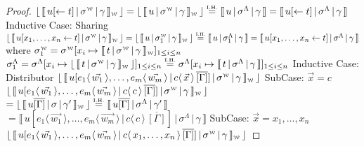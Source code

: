 \documentclass[a4paper,UKenglish,cleveref, autoref]{lipics-v2019}
\newcommand{\share}[3]{#1 [#2 \leftarrow #3]}
\newcommand{\dist}[5]{#1 [ #2 \, \vert \, \fakedist{#4}{#5} \, #3 ]}
\newcommand{\fakedist}[2]{#1 \langle \, #2 \, \rangle}
\newcommand{\weaksymbol}{\mbox{\tiny $\mathcal{W}$}}
\newcommand{\readbackwmap}[3]{\llbracket \, #1 \, \vert \, #2 \, \vert \, #3  \, \rrbracket }
\newcommand{\readweakwmap}[3]{\llbracket \, #1 \, \vert \, #2 \, \vert \, #3  \, \rrbracket_{\weaksymbol} }
\newcommand{\readbackweak}[1]{\lfloor \, #1 \, \rfloor}
\newcommand{\IH}{\stackrel{\hbox{\tiny I.H.}}{\hbox{=}}}
\begin{document}
\begin{proof}
$\readbackweak{\readweakwmap{\share{u}{}{t}}{\sigma^{\weaksymbol}}{\gamma}} = \readbackweak{\readweakwmap{u}{\sigma^{\weaksymbol}}{\gamma}} \IH \readbackwmap{u}{\sigma^{\Lambda}}{\gamma} = \readbackwmap{\share{u}{}{t}}{\sigma^{\Lambda}}{\gamma}$
\newline
\newline
Inductive Case: Sharing
\newline
$\readbackweak{\readweakwmap{\share{u}{x_{1}, \dots, x_{n}}{t}}{\sigma^{\weaksymbol}}{\gamma}} = \readbackweak{\readweakwmap{u}{\sigma_{1}^{\weaksymbol}}{\gamma}} \IH \readbackwmap{u}{\sigma_{1}^{\Lambda}}{\gamma}= \readbackwmap{\share{u}{x_{1}, \dots, x_{n}}{t}}{\sigma^{\Lambda}}{\gamma}$
\newline
where
\newline
$\sigma_{1}^{\weaksymbol} = \sigma^{\weaksymbol} [x_{i} \mapsto \readweakwmap{t}{\sigma^{\weaksymbol}}{\gamma}]_{1 \leq i \leq n}$
\newline
$\sigma_{1}^{\Lambda} = \sigma^{\Lambda} [x_{i} \mapsto \readbackweak{\readweakwmap{t}{\sigma^{\weaksymbol}}{\gamma}}]_{1 \leq i \leq n} \IH  \sigma^{\Lambda} [x_{i} \mapsto \readbackwmap{t}{\sigma^{\Lambda}}{\gamma} ]_{1 \leq i \leq n} $
\newline
\newline
Inductive Case: Distributor
\newline
$\readbackweak{\readweakwmap{\dist{u}{\fakedist{e_{1}}{\vec{w_{1}}}, \dots, \fakedist{e_{m}}{\vec{w_{m}}}}{\overline{[\Gamma]}}{c}{\vec{x}}}{\sigma^{\weaksymbol}}{\gamma}}$
\newline
\newline
\indent SubCase: $\vec{x} = c$
\newline
$\readbackweak{\readweakwmap{\dist{u}{\fakedist{e_{1}}{\vec{w_{1}}}, \dots, \fakedist{e_{m}}{\vec{w_{m}}}}{\overline{[\Gamma]}}{c}{c}}{\sigma^{\weaksymbol}}{\gamma}}$
\newline
$= \readbackweak{\readweakwmap{u \overline{[\Gamma]}}{\sigma}{\gamma'}} \IH \readbackwmap{u \overline{[\Gamma]}}{\sigma^{\Lambda}}{\gamma'}$
\newline
$= \readbackwmap{\dist{u}{\fakedist{e_{1}}{\vec{w_{1}}}, \dots, \fakedist{e_{m}}{\vec{w_{m}}}}{\overline{[\Gamma]}}{c}{c}}{\sigma^{\Lambda}}{\gamma}$
\newline
\newline
\indent SubCase: $\vec{x} = x_{1}, \dots, x_{n}$
\newline
$\readbackweak{\readweakwmap{\dist{u}{\fakedist{e_{1}}{\vec{w_{1}}}, \dots, \fakedist{e_{m}}{\vec{w_{m}}}}{\overline{[\Gamma]}}{c}{x_{1}, \dots, x_{n}}}{\sigma^{\weaksymbol}}{\gamma}}$

\end{proof}
\end{document}
